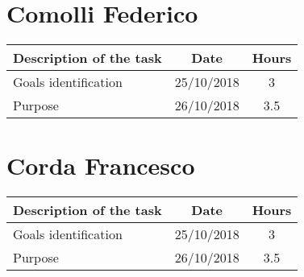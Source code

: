 \section{Comolli Federico}
\begin{center}
\begin{tabular}{l c c}
{\bf Description of the task}&{\bf Date}&{\bf Hours}\\ \hline
Goals identification & {25/10/2018} & {3} \\ \hline
Purpose & {26/10/2018} & {3.5} \\ \hline
\end{tabular}
\end{center}

\section{Corda Francesco}
\begin{center}
\begin{tabular}{l c c}
{\bf Description of the task}&{\bf Date}&{\bf Hours}\\ \hline
Goals identification & {25/10/2018} & {3} \\ \hline
Purpose & {26/10/2018} & {3.5} \\ \hline
\end{tabular}
\end{center}
